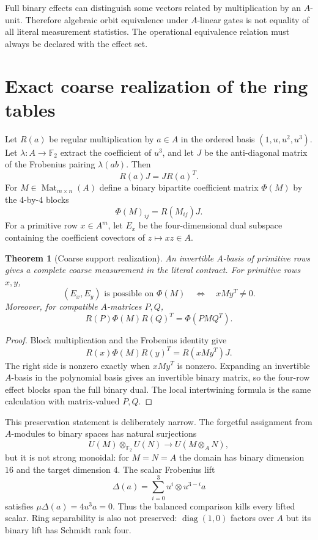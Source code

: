 \documentclass[11pt]{article}
\newtheorem{theorem}{Theorem}[section]
\theoremstyle{definition}
\theoremstyle{remark}
\newcommand{\F}{\mathbb F_2}
\newcommand{\Mat}{\operatorname{Mat}}
\newcommand{\diag}{\operatorname{diag}}
\begin{document}
Full binary effects can distinguish some vectors related by multiplication by an $A$-unit. Therefore algebraic orbit equivalence under $A$-linear gates is not equality of all literal measurement statistics. The operational equivalence relation must always be declared with the effect set.

\section{Exact coarse realization of the ring tables}

Let $R(a)$ be regular multiplication by $a\in A$ in the ordered basis $(1,u,u^2,u^3)$. Let $\lambda:A\to\F$ extract the coefficient of $u^3$, and let $J$ be the anti-diagonal matrix of the Frobenius pairing $\lambda(ab)$. Then
\[
  R(a)J=JR(a)^T.
\]
For $M\in\Mat_{m\times n}(A)$ define a binary bipartite coefficient matrix $\Phi(M)$ by the $4$-by-$4$ blocks
\[
  \Phi(M)_{ij}=R(M_{ij})J.
\]
For a primitive row $x\in A^m$, let $E_x$ be the four-dimensional dual subspace containing the coefficient covectors of $z\mapsto xz\in A$.

\begin{theorem}[Coarse support realization]\label{thm:support}
An invertible $A$-basis of primitive rows gives a complete coarse measurement in the literal contract. For primitive rows $x,y$,
\[
  (E_x,E_y)\text{ is possible on }\Phi(M)
  \quad\Longleftrightarrow\quad xMy^T\ne0.
\]
Moreover, for compatible $A$-matrices $P,Q$,
\[
  R(P)\Phi(M)R(Q)^T=\Phi(PMQ^T).
\]
\end{theorem}

\begin{proof}
Block multiplication and the Frobenius identity give
\[
  R(x)\Phi(M)R(y)^T=R(xMy^T)J.
\]
The right side is nonzero exactly when $xMy^T$ is nonzero. Expanding an invertible $A$-basis in the polynomial basis gives an invertible binary matrix, so the four-row effect blocks span the full binary dual. The local intertwining formula is the same calculation with matrix-valued $P,Q$.
\end{proof}

This preservation statement is deliberately narrow. The forgetful assignment from $A$-modules to binary spaces has natural surjections
\[
  U(M)\otimes_{\F}U(N)\longrightarrow U(M\otimes_A N),
\]
but it is not strong monoidal: for $M=N=A$ the domain has binary dimension $16$ and the target dimension $4$. The scalar Frobenius lift
\[
  \Delta(a)=\sum_{i=0}^{3}u^i\otimes u^{3-i}a
\]
satisfies $\mu\Delta(a)=4u^3a=0$. Thus the balanced comparison kills every lifted scalar. Ring separability is also not preserved: $\diag(1,0)$ factors over $A$ but its binary lift has Schmidt rank four.
\end{document}
